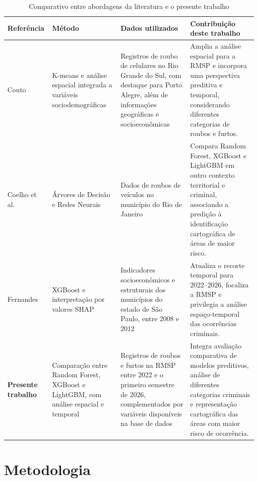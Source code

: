 \documentclass[12pt]{article}
\begin{document}
\begin{table}[!htbp]
\centering
\caption{Comparativo entre abordagens da literatura e o presente trabalho}
\label{tab:comparativo}
\small
\renewcommand{\arraystretch}{1.3}

\begin{tabular}{|p{2.5cm}|p{3.2cm}|p{4.0cm}|p{4.0cm}|}
\hline
\textbf{Referência} & \textbf{Método} & \textbf{Dados utilizados} & \textbf{Contribuição deste trabalho} \\
\hline

Couto \cite{couto2024identificaccao} &
K-means e análise espacial integrada a variáveis sociodemográficas &
Registros de roubo de celulares no Rio Grande do Sul, com destaque para Porto Alegre, além de informações geográficas e socioeconômicas &
Amplia a análise espacial para a RMSP e incorpora uma perspectiva preditiva e temporal, considerando diferentes categorias de roubos e furtos. \\
\hline

Coelho et al. \cite{de2025previsao} &
Árvores de Decisão e Redes Neurais &
Dados de roubos de veículos no município do Rio de Janeiro &
Compara Random Forest, XGBoost e LightGBM em outro contexto territorial e criminal, associando a predição à identificação cartográfica de áreas de maior risco. \\
\hline

Fernandes \cite{fernandes2025aplicaccao} &
XGBoost e interpretação por valores SHAP &
Indicadores socioeconômicos e estruturais dos municípios do estado de São Paulo, entre 2008 e 2012 &
Atualiza o recorte temporal para 2022--2026, focaliza a RMSP e privilegia a análise espaço-temporal das ocorrências criminais. \\
\hline

\textbf{Presente trabalho} &
Comparação entre Random Forest, XGBoost e LightGBM, com análise espacial e temporal &
Registros de roubos e furtos na RMSP entre 2022 e o primeiro semestre de 2026, complementados por variáveis disponíveis na base de dados &
Integra avaliação comparativa de modelos preditivos, análise de diferentes categorias criminais e representação cartográfica das áreas com maior risco de ocorrência. \\
\hline

\end{tabular}
\end{table}

\vspace{1.2cm}

\section{Metodologia}
\end{document}
